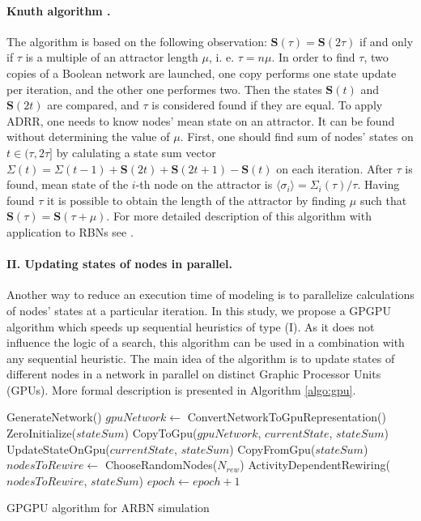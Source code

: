 \documentclass[procedia]{easychair}
\begin{document}
	\paragraph{Knuth algorithm \cite{knuth1981art}.} The algorithm is based on the following observation: $\mathbf{S}(\tau) = \mathbf{S}(2\tau)$ if and only if $\tau$ is a multiple of an attractor length $\mu$, i. e. $\tau = n\mu$. In order to find $\tau$, two copies of a Boolean network are launched, one copy performs one state update per iteration, and the other one performes two. Then the states $\mathbf{S}(t)$ and $\mathbf{S}(2t)$ are compared, and $\tau$ is considered found if they are equal. To apply ADRR, one needs to know nodes' mean state on an attractor. It can be found without determining the value of $\mu$. First, one should find sum of nodes' states on $t \in (\tau, 2\tau]$ by calulating a state sum vector $\Sigma(t) = \Sigma(t - 1) + \mathbf{S}(2t) + \mathbf{S}(2t + 1) - \mathbf{S}(t)$ on each iteration. After $\tau$ is found, mean state of the $i$-th node on the attractor is $\langle\sigma_i\rangle = \Sigma_i(\tau) / \tau$. Having found $\tau$ it is possible to obtain the length of the attractor by finding $\mu$ such that $\mathbf{S}(\tau) = \mathbf{S}(\tau + \mu)$. For more detailed description of this algorithm with application to RBNs see \cite{bhattacharjya1996median}.

\paragraph{II. Updating states of nodes in parallel.} Another way to reduce an execution time of modeling is to parallelize calculations of nodes' states at a particular iteration. In this study, we propose a GPGPU algorithm which speeds up sequential heuristics of type (I). As it does not influence the logic of a search, this algorithm can be used in a combination with any sequential heuristic. The main idea of the algorithm is to update states of different nodes in a network in parallel on distinct Graphic Processor Units (GPUs). More formal description is presented in Algorithm \ref{algo:gpu}.

	\begin{algorithm}[ht!]
		\label{algo:gpu}
		GenerateNetwork()\;
		{
			$gpuNetwork \leftarrow$ ConvertNetworkToGpuRepresentation()\;
			ZeroInitialize($stateSum$)\;
			CopyToGpu($gpuNetwork$, $currentState$, $stateSum$)\;
			{ 	
				UpdateStateOnGpu($currentState$, $stateSum$)\;
			}
			CopyFromGpu($stateSum$)\;
			$nodesToRewire \leftarrow$ ChooseRandomNodes($N_{rew}$)\;
			ActivityDependentRewiring($nodesToRewire$, $stateSum$)\;
			$epoch \leftarrow  epoch + 1$\;
		}
		\caption{GPGPU algorithm for ARBN simulation}
	\end{algorithm}
\end{document}
